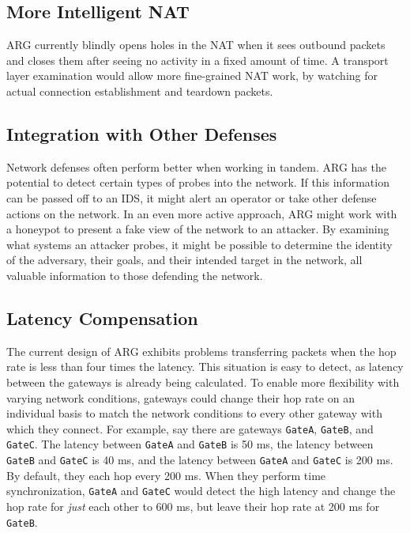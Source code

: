 
\subsection{More Intelligent NAT}
\par \ac{ARG} currently blindly opens holes in the \ac{NAT} when it sees outbound packets and closes them after seeing no activity in a fixed amount of time. A transport layer examination would allow more fine-grained \ac{NAT} work, by watching for actual connection establishment and teardown packets. 

\subsection{Integration with Other Defenses}
\par Network defenses often perform better when working in tandem. \ac{ARG} has the potential to detect certain types of probes into the network. If this information can be passed off to an \ac{IDS}, it might alert an operator or take other defense actions on the network. In an even more active approach, \ac{ARG} might work with a honeypot to present a fake view of the network to an attacker. By examining what systems an attacker probes, it might be possible to determine the identity of the adversary, their goals, and their intended target in the network, all valuable information to those defending the network.

\subsection{Latency Compensation}
\par The current design of \ac{ARG} exhibits problems transferring packets when the hop rate is less than four times the latency. This situation is easy to detect, as latency between the gateways is already being calculated. To enable more flexibility with varying network conditions, gateways could change their hop rate on an individual basis to match the network conditions to every other gateway with which they connect. For example, say there are gateways \texttt{GateA}, \texttt{GateB}, and \texttt{GateC}. The latency between \texttt{GateA} and \texttt{GateB} is 50 ms, the latency between \texttt{GateB} and \texttt{GateC} is 40 ms, and the latency between \texttt{GateA} and \texttt{GateC} is 200 ms. By default, they each hop every 200 ms. When they perform time synchronization, \texttt{GateA} and \texttt{GateC} would detect the high latency and change the hop rate for \textit{just} each other to 600 ms, but leave their hop rate at 200 ms for \texttt{GateB}. 

